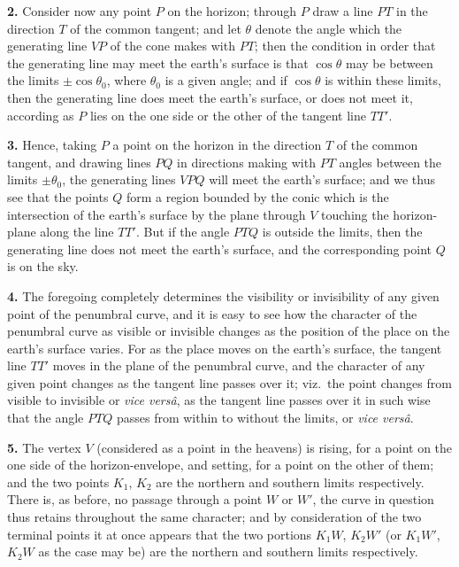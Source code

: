 \documentclass[12pt,a4paper]{article}
\theoremstyle{definition}
\begin{document}
\medskip
\noindent\textbf{2.}\quad
Consider now any point $P$ on the horizon; through $P$ draw a line $PT$ in the direction $T$ of the common tangent; and let $\theta$ denote the angle which the generating line $VP$ of the cone makes with $PT$; then the condition in order that the generating line may meet the earth's surface is that $\cos\theta$ may be between the limits $\pm\cos\theta_0$, where $\theta_0$ is a given angle; and if $\cos\theta$ is within these limits, then the generating line does meet the earth's surface, or does not meet it, according as $P$ lies on the one side or the other of the tangent line $TT'$.

\medskip
\noindent\textbf{3.}\quad
Hence, taking $P$ a point on the horizon in the direction $T$ of the common tangent, and drawing lines $PQ$ in directions making with $PT$ angles between the limits $\pm\theta_0$, the generating lines $VPQ$ will meet the earth's surface; and we thus see that the points $Q$ form a region bounded by the conic which is the intersection of the earth's surface by the plane through $V$ touching the horizon-plane along the line $TT'$. But if the angle $PTQ$ is outside the limits, then the generating line does not meet the earth's surface, and the corresponding point $Q$ is on the sky.

\medskip
\noindent\textbf{4.}\quad
The foregoing completely determines the visibility or invisibility of any given point of the penumbral curve, and it is easy to see how the character of the penumbral curve as visible or invisible changes as the position of the place on the earth's surface varies. For as the place moves on the earth's surface, the tangent line $TT'$ moves in the plane of the penumbral curve, and the character of any given point changes as the tangent line passes over it; viz.\ the point changes from visible to invisible or \textit{vice vers\^a}, as the tangent line passes over it in such wise that the angle $PTQ$ passes from within to without the limits, or \textit{vice vers\^a}.

\medskip
\noindent\textbf{5.}\quad
The vertex $V$ (considered as a point in the heavens) is rising, for a point on the one side of the horizon-envelope, and setting, for a point on the other of them; and the two points $K_1$, $K_2$ are the northern and southern limits respectively. There is, as before, no passage through a point $W$ or $W'$, the curve in question thus retains throughout the same character; and by consideration of the two terminal points it at once appears that the two portions $K_1W$, $K_2W'$ (or $K_1W'$, $K_2W$ as the case may be) are the northern and southern limits respectively.
\end{document}
